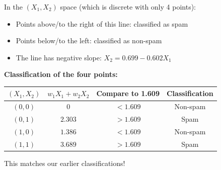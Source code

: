 \documentclass[12pt]{article}
\begin{document}
\begin{solution}
In the $(X_1, X_2)$ space (which is discrete with only 4 points):
\begin{itemize}
    \item Points above/to the right of this line: classified as spam
    \item Points below/to the left: classified as non-spam
    \item The line has negative slope: $X_2 = 0.699 - 0.602 X_1$
\end{itemize}

\textbf{Classification of the four points:}

\begin{center}
\begin{tabular}{|c|c|c|c|}
\hline
$(X_1, X_2)$ & $w_1 X_1 + w_2 X_2$ & Compare to 1.609 & Classification \\
\hline
$(0, 0)$ & $0$ & $< 1.609$ & Non-spam \\
$(0, 1)$ & $2.303$ & $> 1.609$ & Spam \\
$(1, 0)$ & $1.386$ & $< 1.609$ & Non-spam \\
$(1, 1)$ & $3.689$ & $> 1.609$ & Spam \\
\hline
\end{tabular}
\end{center}

This matches our earlier classifications!
\end{solution}
\end{document}
